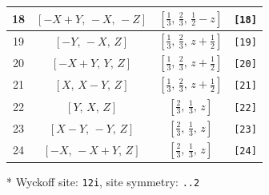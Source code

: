\documentclass[fleqn,8pt]{jsarticle}
\begin{document}
\begin{longtable}{cccc}
18 & $\left[ - X + Y,\, - X,\, - Z \right]$ & $\left[ \frac{1}{3},\, \frac{2}{3},\, \frac{1}{2} - z \right]$ & {\tt [18]} \\ \hline
19 & $\left[ - Y,\, - X,\, Z \right]$ & $\left[ \frac{1}{3},\, \frac{2}{3},\, z + \frac{1}{2} \right]$ & {\tt [19]} \\ \hline
20 & $\left[ - X + Y,\, Y,\, Z \right]$ & $\left[ \frac{1}{3},\, \frac{2}{3},\, z + \frac{1}{2} \right]$ & {\tt [20]} \\ \hline
21 & $\left[ X,\, X - Y,\, Z \right]$ & $\left[ \frac{1}{3},\, \frac{2}{3},\, z + \frac{1}{2} \right]$ & {\tt [21]} \\ \hline
22 & $\left[ Y,\, X,\, Z \right]$ & $\left[ \frac{2}{3},\, \frac{1}{3},\, z \right]$ & {\tt [22]} \\ \hline
23 & $\left[ X - Y,\, - Y,\, Z \right]$ & $\left[ \frac{2}{3},\, \frac{1}{3},\, z \right]$ & {\tt [23]} \\ \hline
24 & $\left[ - X,\, - X + Y,\, Z \right]$ & $\left[ \frac{2}{3},\, \frac{1}{3},\, z \right]$ & {\tt [24]} \\
\end{longtable}
* Wyckoff site: {\tt 12i}, site symmetry: {\tt ..2}
\renewcommand{\arraystretch}{1.2}
\end{document}

